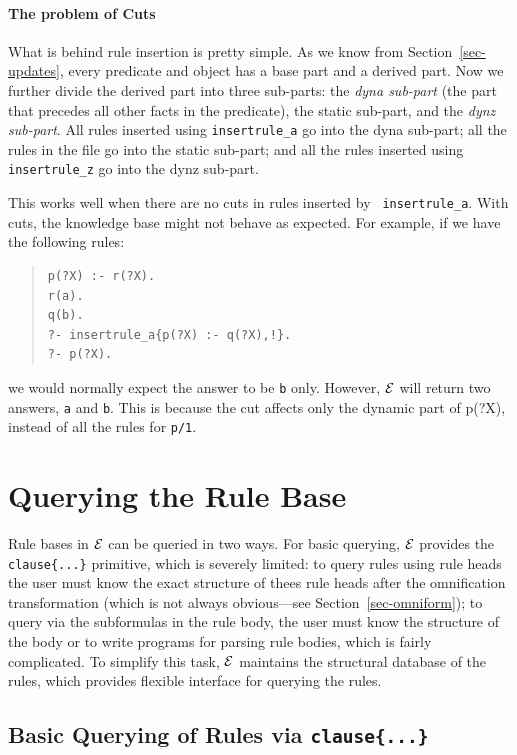\documentclass[11pt]{article}
\newcommand{\ERGO}{\mbox{\ensuremath{\cal{E}}\smaller{{\sc{RGO}}}}\xspace}
\newcommand{\FLSYSTEM}{\ERGO}
\begin{document}
\paragraph{The problem of Cuts} What is behind rule insertion is pretty
simple. As we know from Section~\ref{sec-updates}, every predicate and
object has a base part and a derived part. Now we further divide the
derived part into three sub-parts: the \emph{dyna sub-part} (the part that
precedes all other facts in the predicate), the static sub-part, and the
\emph{dynz sub-part}. All rules inserted using {\tt insertrule\_a} go into
the dyna sub-part; all the rules in the file go into the static
sub-part; and all the rules inserted using {\tt insertrule\_z} go into the
dynz sub-part.

This works well when there are no cuts in rules inserted by {\tt
  insertrule\_a}. With cuts, the knowledge base might not
behave as expected. For example, if we have the following rules:
\begin{quote}
\begin{verbatim}
p(?X) :- r(?X).
r(a).
q(b).
?- insertrule_a{p(?X) :- q(?X),!}.
?- p(?X).
\end{verbatim}
\end{quote}
\noindent
we would normally expect the answer to be {\tt b} only. However, \FLSYSTEM will
return two answers, {\tt a} and {\tt b}. This is because the cut affects
only the dynamic part of p(?X), instead of all the rules for {\tt p/1}.

\section{Querying the Rule Base}
\label{sec:clause}

Rule bases in \ERGO can be queried in two ways. For basic
querying, \ERGO provides the \texttt{clause\{...\}} primitive, which is
severely limited: to query rules 
using rule heads the user must know the exact structure of thees rule heads
after the omnification transformation (which is not always obvious---see
Section~\ref{sec-omniform}); to query via the subformulas in the rule
body, the user must know the structure of the body or to write programs
for parsing rule bodies, which is fairly complicated.
To simplify this task, \ERGO maintains the structural database of the
rules, which provides flexible interface for querying the rules.

\subsection{Basic Querying of Rules via \texttt{clause\{...\}}}
\end{document}
